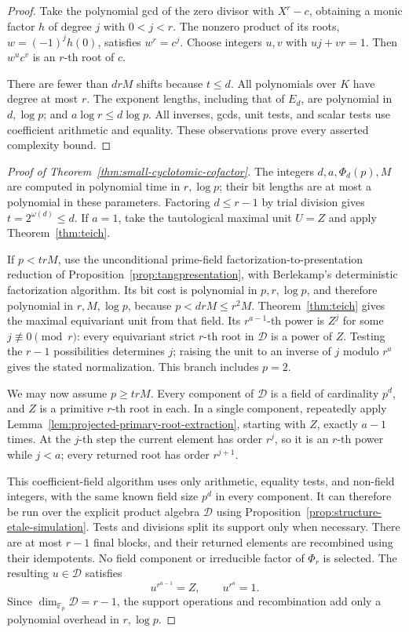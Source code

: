 \documentclass[11pt]{article}
\theoremstyle{definition}
\theoremstyle{remark}
\begin{document}
\begin{proof}
Take the polynomial gcd of the zero divisor with \(X^r-c\),
obtaining a monic factor \(h\) of degree \(j\) with
\(0<j<r\). The nonzero product of its roots,
\(w=(-1)^jh(0)\), satisfies \(w^r=c^j\).
Choose integers \(u,v\) with \(uj+vr=1\). Then
\(w^u c^v\) is an \(r\)-th root of \(c\).

There are fewer than \(drM\) shifts because \(t\leq d\).
All polynomials over \(K\) have degree at most \(r\).
The exponent lengths, including that of \(E_d\), are
polynomial in \(d,\log p\); and
\(a\log r\leq d\log p\). All inverses, gcds, unit tests,
and scalar tests use coefficient arithmetic and equality.
These observations prove every asserted complexity bound.
\end{proof}

\begin{proof}[Proof of Theorem~\ref{thm:small-cyclotomic-cofactor}]
The integers \(d,a,\Phi_d(p),M\) are computed in polynomial
time in \(r,\log p\); their bit lengths are at most a
polynomial in these parameters. Factoring \(d\leq r-1\)
by trial division gives \(t=2^{\omega(d)}\leq d\).
If \(a=1\), take the tautological maximal unit \(U=Z\)
and apply Theorem~\ref{thm:teich}.

If \(p<trM\), use the unconditional prime-field
factorization-to-presentation reduction of
Proposition~\ref{prop:tangpresentation}, with Berlekamp's
deterministic factorization algorithm. Its bit cost is
polynomial in \(p,r,\log p\), and therefore polynomial in
\(r,M,\log p\), because \(p<drM\leq r^2M\).
Theorem~\ref{thm:teich} gives the maximal equivariant unit
from that field. Its \(r^{a-1}\)-th power is \(Z^j\) for
some \(j\not\equiv0\pmod r\): every equivariant strict
\(r\)-th root in \(\mathcal D\) is a power of \(Z\).
Testing the \(r-1\) possibilities determines \(j\);
raising the unit to an inverse of \(j\) modulo \(r^a\)
gives the stated normalization. This branch includes \(p=2\).

We may now assume \(p\geq trM\). Every component of
\(\mathcal D\) is a field of cardinality \(p^d\), and
\(Z\) is a primitive \(r\)-th root in each. In a single
component, repeatedly apply
Lemma~\ref{lem:projected-primary-root-extraction}, starting
with \(Z\), exactly \(a-1\) times. At the \(j\)-th step
the current element has order \(r^j\), so it is an
\(r\)-th power while \(j<a\); every returned root has
order \(r^{j+1}\).

This coefficient-field algorithm uses only arithmetic,
equality tests, and non-field integers, with the same known
field size \(p^d\) in every component. It can therefore
be run over the explicit product algebra \(\mathcal D\)
using Proposition~\ref{prop:structure-etale-simulation}.
Tests and divisions split its support only when necessary.
There are at most \(r-1\) final blocks, and their returned
elements are recombined using their idempotents. No field
component or irreducible factor of \(\Phi_r\) is selected.
The resulting \(u\in\mathcal D\) satisfies
\[
                        u^{r^{a-1}}=Z,
                        \qquad u^{r^a}=1.
\]
Since \(\dim_{\mathbb F_p}\mathcal D=r-1\), the support
operations and recombination add only a polynomial overhead
in \(r,\log p\).


\end{proof}
\end{document}
